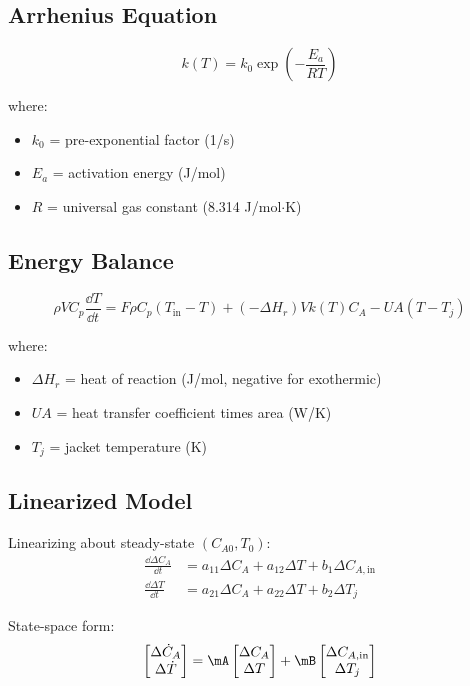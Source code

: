 \subsection{Arrhenius Equation}

\begin{equation}
k(T) = k_0 \exp\left(-\frac{E_a}{RT}\right)
\end{equation}

where:
\begin{itemize}
    \item $k_0$ = pre-exponential factor (1/s)
    \item $E_a$ = activation energy (J/mol)
    \item $R$ = universal gas constant (8.314 J/mol$\cdot$K)
\end{itemize}

\subsection{Energy Balance}

\begin{equation}
\rho V C_p\frac{\dd T}{\dd t} = F\rho C_p(T_{\text{in}} - T) + (-\Delta H_r)Vk(T)C_A - UA(T - T_j)
\end{equation}

where:
\begin{itemize}
    \item $\Delta H_r$ = heat of reaction (J/mol, negative for exothermic)
    \item $UA$ = heat transfer coefficient times area (W/K)
    \item $T_j$ = jacket temperature (K)
\end{itemize}

\subsection{Linearized Model}

Linearizing about steady-state $(C_{A0}, T_0)$:
\begin{align}
\frac{\dd \Delta C_A}{\dd t} &= a_{11}\Delta C_A + a_{12}\Delta T + b_1\Delta C_{A,\text{in}} \\
\frac{\dd \Delta T}{\dd t} &= a_{21}\Delta C_A + a_{22}\Delta T + b_2\Delta T_j
\end{align}

State-space form:
\begin{equation}
\begin{bmatrix} \Delta\dot{C}_A \\ \Delta\dot{T} \end{bmatrix} = \mA \begin{bmatrix} \Delta C_A \\ \Delta T \end{bmatrix} + \mB \begin{bmatrix} \Delta C_{A,\text{in}} \\ \Delta T_j \end{bmatrix}
\end{equation}

